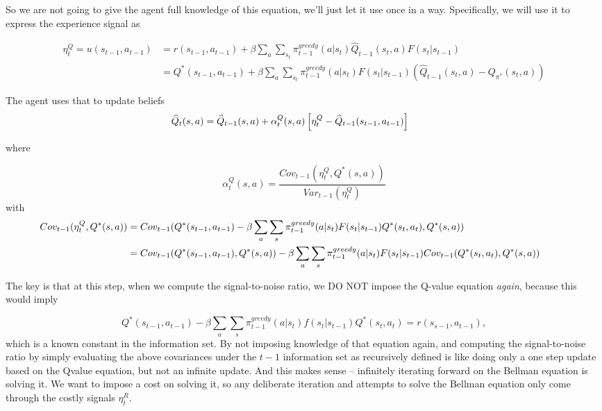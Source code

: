\documentclass[12pt]{article}%
\begin{document}
So we are not going to give the agent full knowledge of this equation, we'll
just let it use once in a way. Specifically, we will use it to express the
experience signal as%

\begin{align*}
\eta_{t}^{Q} = u(s_{t-1}, a_{t-1})  &  = r(s_{t-1}, a_{t-1}) + \beta\sum_{a}
\sum_{s_{t}} \pi_{t-1}^{greedy} (a |s_{t}) \widehat Q_{t-1}(s_{t},a) F(s_{t} |
s_{t-1})\\
&  = Q^{*}(s_{t-1}, a_{t-1}) + \beta\sum_{a} \sum_{s_{t}} \pi_{t-1}^{greedy}
(a |s_{t}) F(s_{t} | s_{t-1}) \left(  \widehat Q_{t-1}(s_{t},a) - Q_{\pi^{*}%
}(s_{t}, a) \right)
\end{align*}


The agent uses that to update beliefs {\small
\[
\hspace{-1cm} \widehat{Q}_{t}(s,a)=\widehat{Q}_{t-1}(s,a)+\alpha_{t}%
^{Q}(s,a)\left[  \eta_{t}^{Q}- \widehat{Q}_{t-1} (s_{t-1},a_{t-1}) \right]
\]
}

where%

\[
\alpha_{t}^{Q}(s,a) = \frac{ Cov_{t-1}( \eta_{t}^{Q}, Q^{*}(s,a))}{Var_{t-1}(
\eta_{t}^{Q})}
\]
with
\begin{align*}
\hspace{-1cm} Cov_{t-1}( \eta_{t}^{Q}, Q^{*}(s,a))  &  = Cov_{t-1}(
Q^{*}(s_{t-1}, a_{t-1}) - \beta\sum_{a} \sum_{s} \pi_{t-1}^{greedy}(a |s_{t})
F(s_{t}| s_{t-1}) Q^{*}(s_{t},a_{t}), Q^{*}(s,a))\\
&  = Cov_{t-1}( Q^{*}(s_{t-1}, a_{t-1}), Q^{*}(s,a)) - \beta\sum_{a} \sum_{s}
\pi_{t-1}^{greedy}(a |s_{t}) F(s_{t}| s_{t-1}) Cov_{t-1}(Q^{*}(s_{t},a_{t}),
Q^{*}(s,a))\\
\end{align*}


The key is that at this step, when we compute the signal-to-noise ratio, we DO
NOT impose the Q-value equation \emph{again}, because this would imply%

\[
Q^{*}(s_{t-1}, a_{t-1}) - \beta\sum_{a} \sum_{s} \pi_{t-1}^{greedy}(a |s_{t})
f(s_{t}| s_{t-1}) Q^{*}(s_{t},a_{t}) = r(s_{s-1}, a_{t-1}),
\]
which is a known constant in the information set. By not imposing knowledge of
that equation again, and computing the signal-to-noise ratio by simply
evaluating the above covariances under the $t-1$ information set as
recursively defined is like doing only a one step update based on the Qvalue
equation, but not an infinite update. And this makes sense -- infinitely
iterating forward on the Bellman equation is solving it. We want to impose a
cost on solving it, so any deliberate iteration and attempts to solve the
Bellman equation only come through the costly signals $\eta_{t}^{R}$. \bigskip
\end{document}
